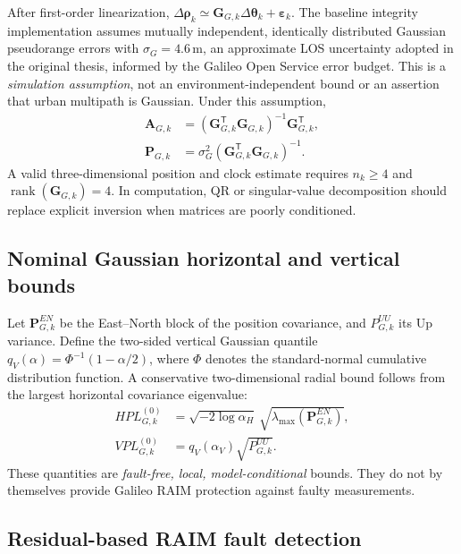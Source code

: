 \documentclass[pdflatex,sn-mathphys-num]{sn-jnl}
\newcommand{\vect}[1]{\boldsymbol{#1}}
\newcommand{\mat}[1]{\mathbf{#1}}
\newcommand{\trans}{^{\mathsf T}}
\begin{document}
After first-order linearization, $\Delta\vect{\rho}_k\simeq
\mat{G}_{G,k}\Delta\vect{\theta}_k+\vect{\varepsilon}_k$.
The baseline integrity implementation assumes mutually independent,
identically distributed Gaussian pseudorange errors with
$\sigma_G=4.6\,\mathrm{m}$, an approximate LOS uncertainty adopted in the
original thesis, informed by the Galileo Open Service error budget\cite{GalileoSDD}. This is a \emph{simulation assumption}, not an
environment-independent bound or an assertion that urban multipath is
Gaussian. Under this assumption,
\begin{align}
 \mat{A}_{G,k}&=(\mat{G}_{G,k}\trans\mat{G}_{G,k})^{-1}
 \mat{G}_{G,k}\trans,\label{eq:Agnss}\\
 \mat{P}_{G,k}&=\sigma_G^2
 (\mat{G}_{G,k}\trans\mat{G}_{G,k})^{-1}.\label{eq:Pgnss}
\end{align}
A valid three-dimensional position and clock estimate requires
$n_k\geq4$ and $\operatorname{rank}(\mat{G}_{G,k})=4$.
In computation, QR or singular-value decomposition should replace
explicit inversion when matrices are poorly conditioned.

\subsection{Nominal Gaussian horizontal and vertical bounds}

Let $\mat{P}_{G,k}^{EN}$ be the East--North block of the position
covariance, and $P_{G,k}^{UU}$ its Up variance. Define the two-sided
vertical Gaussian quantile $q_V(\alpha)=\Phi^{-1}(1-\alpha/2)$, where
$\Phi$ denotes the standard-normal cumulative distribution function.
A conservative two-dimensional radial bound follows from the largest
horizontal covariance eigenvalue:
\begin{align}
 HPL^{(0)}_{G,k}&=
 \sqrt{-2\log\alpha_H}\,
 \sqrt{\lambda_{\max}(\mat{P}_{G,k}^{EN})},\label{eq:hplgnssnom}\\
 VPL^{(0)}_{G,k}&=
 q_V(\alpha_V)\sqrt{P_{G,k}^{UU}}.\label{eq:vplgnssnom}
\end{align}
These quantities are \emph{fault-free, local, model-conditional} bounds.
They do not by themselves provide Galileo RAIM protection against faulty
measurements.

\subsection{Residual-based RAIM fault detection}\label{sec:raim}
\end{document}
